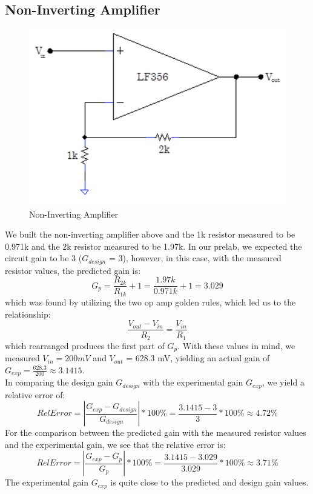 \documentclass{article}
\begin{document}
\subsection{Non-Inverting Amplifier}
    \begin{figure}[H]
        \centering
        \includegraphics[scale = 0.5]{5.png}
        \caption{Non-Inverting Amplifier ~\cite{webfig}}
        \label{fig:my_label}
    \end{figure}
    We built the non-inverting amplifier above and the 1k resistor measured to be 0.971k and the 2k resistor measured to be 1.97k. In our prelab, we expected the circuit gain to be 3 ($G_{design}$ = 3), however, in this case, with the measured resistor values, the predicted gain is:
    \begin{equation}
        G_p = \frac{R_{2k}}{R_{1k}} + 1 = \frac{1.97k}{0.971k} + 1 = 3.029
    \end{equation}
    which was found by utilizing the two op amp golden rules, which led us to the relationship:
    \begin{equation}
        \frac{V_{out} - V_{in}}{R_2} = \frac{V_{in}}{R_1}
    \end{equation}
    which rearranged produces the first part of $G_p$. With these values in mind, we measured $V_{in} = 200 mV$ and $V_{out}$ = 628.3 mV, yielding an actual gain of $G_{exp} = \frac{628.3}{200} \approx 3.1415$.\\\indent In comparing the design gain $G_{design}$ with the experimental gain $G_{exp}$, we yield a relative error of:
    \begin{equation}
        RelError = |\frac{G_{exp} - G_{design}}{G_{design}}| * 100\% = \frac{3.1415 - 3}{3} * 100\% \approx 4.72\%
    \end{equation}
    For the comparison between the predicted gain with the measured resistor values and the experimental gain, we see that the relative error is:
    \begin{equation}
        RelError = |\frac{G_{exp} - G_{p}}{G_{p}}| * 100\% = \frac{3.1415 - 3.029}{3.029} * 100\% \approx 3.71\%
    \end{equation}
    The experimental gain $G_{exp}$ is quite close to the predicted and design gain values.
\end{document}
